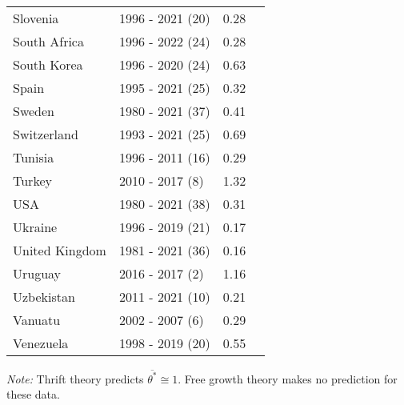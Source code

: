 \begin{table}[pos=h]
{{\begin{tabular}{llrr}
Slovenia & 1996 - 2021 (20) & 0.28\\
South Africa & 1996 - 2022 (24) & 0.28\\
South Korea & 1996 - 2020 (24) & 0.63\\
Spain & 1995 - 2021 (25) & 0.32\\
\addlinespace
Sweden & 1980 - 2021 (37) & 0.41\\
Switzerland & 1993 - 2021 (25) & 0.69\\
Tunisia & 1996 - 2011 (16) & 0.29\\
Turkey & 2010 - 2017 (8) & 1.32\\
USA & 1980 - 2021 (38) & 0.31\\
\addlinespace
Ukraine & 1996 - 2019 (21) & 0.17\\
United Kingdom & 1981 - 2021 (36) & 0.16\\
Uruguay & 2016 - 2017 (2) & 1.16\\
Uzbekistan & 2011 - 2021 (10) & 0.21\\
Vanuatu & 2002 - 2007 (6) & 0.29\\
\addlinespace
Venezuela & 1998 - 2019 (20) & 0.55\\
\bottomrule \end{tabular}

}
}
\begin{flushleft}
\footnotesize \emph{Note:} Thrift theory predicts \(\overline{\theta^*} \cong 1\). Free growth theory makes no prediction for these data.
\end{flushleft}
\end{table}